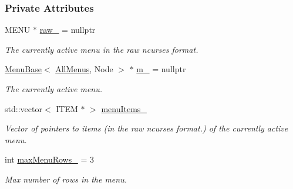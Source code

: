 \subsubsection*{Private Attributes}
\begin{DoxyCompactItemize}
\item 
M\+E\+NU $\ast$ \hyperlink{structAllMenus_aff7d2fba069f0bc987a28202992239f3}{raw\+\_\+} = nullptr\hypertarget{structAllMenus_aff7d2fba069f0bc987a28202992239f3}{}\label{structAllMenus_aff7d2fba069f0bc987a28202992239f3}

\begin{DoxyCompactList}\small\item\em The currently active menu in the raw {\ttfamily ncurses} format. \end{DoxyCompactList}\item 
\hyperlink{structMenuBase}{Menu\+Base}$<$ \hyperlink{structAllMenus}{All\+Menus}, Node $>$ $\ast$ \hyperlink{structAllMenus_a7ba49283dcb78afe40b4e9cb84edcdcf}{m\+\_\+} = nullptr\hypertarget{structAllMenus_a7ba49283dcb78afe40b4e9cb84edcdcf}{}\label{structAllMenus_a7ba49283dcb78afe40b4e9cb84edcdcf}

\begin{DoxyCompactList}\small\item\em The currently active menu. \end{DoxyCompactList}\item 
std\+::vector$<$ I\+T\+EM $\ast$ $>$ \hyperlink{structAllMenus_ac92c8f85c7ab34717c3857fc35205623}{menu\+Items\+\_\+}\hypertarget{structAllMenus_ac92c8f85c7ab34717c3857fc35205623}{}\label{structAllMenus_ac92c8f85c7ab34717c3857fc35205623}

\begin{DoxyCompactList}\small\item\em Vector of pointers to items (in the raw {\ttfamily ncurses} format.) of the currently active menu. \end{DoxyCompactList}\item 
int \hyperlink{structAllMenus_a0339bd5a960d04c32241237953a5627c}{max\+Menu\+Rows\+\_\+} = 3\hypertarget{structAllMenus_a0339bd5a960d04c32241237953a5627c}{}\label{structAllMenus_a0339bd5a960d04c32241237953a5627c}

\begin{DoxyCompactList}\small\item\em Max number of rows in the menu. \end{DoxyCompactList}\end{DoxyCompactItemize}



